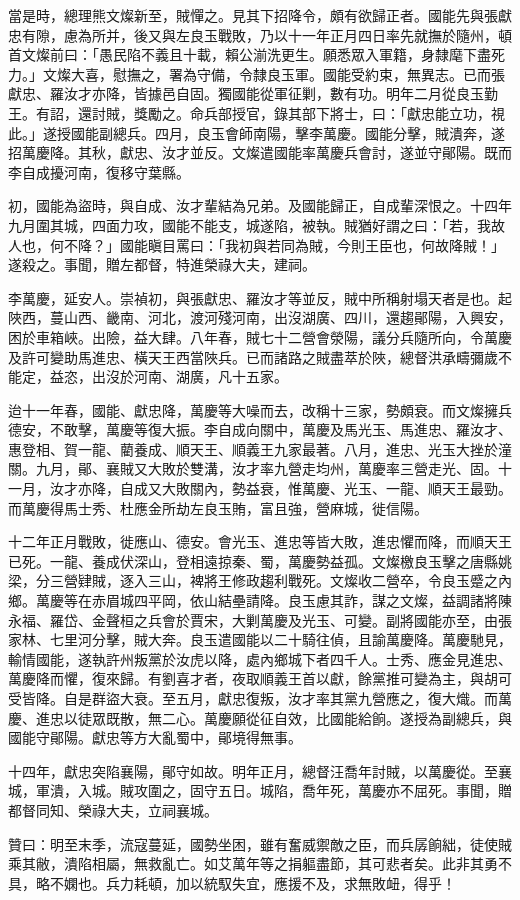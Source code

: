 \begin{pinyinscope}
當是時，總理熊文燦新至，賊憚之。見其下招降令，頗有欲歸正者。國能先與張獻忠有隙，慮為所并，後又與左良玉戰敗，乃以十一年正月四日率先就撫於隨州，頓首文燦前曰：「愚民陷不義且十載，賴公湔洗更生。願悉眾入軍籍，身隸麾下盡死力。」文燦大喜，慰撫之，署為守備，令隸良玉軍。國能受約束，無異志。已而張獻忠、羅汝才亦降，皆據邑自固。獨國能從軍征剿，數有功。明年二月從良玉勤王。有詔，還討賊，獎勵之。命兵部授官，錄其部下將士，曰：「獻忠能立功，視此。」遂授國能副總兵。四月，良玉會師南陽，擊李萬慶。國能分擊，賊潰奔，遂招萬慶降。其秋，獻忠、汝才並反。文燦遣國能率萬慶兵會討，遂並守鄖陽。既而李自成擾河南，復移守葉縣。

初，國能為盜時，與自成、汝才輩結為兄弟。及國能歸正，自成輩深恨之。十四年九月圍其城，四面力攻，國能不能支，城遂陷，被執。賊猶好謂之曰：「若，我故人也，何不降？」國能瞋目罵曰：「我初與若同為賊，今則王臣也，何故降賊！」遂殺之。事聞，贈左都督，特進榮祿大夫，建祠。

李萬慶，延安人。崇禎初，與張獻忠、羅汝才等並反，賊中所稱射塌天者是也。起陜西，蔓山西、畿南、河北，渡河殘河南，出沒湖廣、四川，還趨鄖陽，入興安，困於車箱峽。出險，益大肆。八年春，賊七十二營會滎陽，議分兵隨所向，令萬慶及許可變助馬進忠、橫天王西當陜兵。已而諸路之賊盡萃於陜，總督洪承疇彌歲不能定，益恣，出沒於河南、湖廣，凡十五家。

迨十一年春，國能、獻忠降，萬慶等大噪而去，改稱十三家，勢頗衰。而文燦擁兵德安，不敢擊，萬慶等復大振。李自成向關中，萬慶及馬光玉、馬進忠、羅汝才、惠登相、賀一龍、藺養成、順天王、順義王九家最著。八月，進忠、光玉大挫於潼關。九月，鄖、襄賊又大敗於雙溝，汝才率九營走均州，萬慶率三營走光、固。十一月，汝才亦降，自成又大敗關內，勢益衰，惟萬慶、光玉、一龍、順天王最勁。而萬慶得馬士秀、杜應金所劫左良玉賄，富且強，營麻城，徙信陽。

十二年正月戰敗，徙應山、德安。會光玉、進忠等皆大敗，進忠懼而降，而順天王已死。一龍、養成伏深山，登相遠掠秦、蜀，萬慶勢益孤。文燦檄良玉擊之唐縣姚梁，分三營肄賊，逐入三山，裨將王修政趨利戰死。文燦收二營卒，令良玉蹙之內鄉。萬慶等在赤眉城四平岡，依山結壘請降。良玉慮其詐，謀之文燦，益調諸將陳永福、羅岱、金聲桓之兵會於賈宋，大剿萬慶及光玉、可變。副將國能亦至，由張家林、七里河分擊，賊大奔。良玉遣國能以二十騎往偵，且諭萬慶降。萬慶馳見，輸情國能，遂執許州叛黨於汝虎以降，處內鄉城下者四千人。士秀、應金見進忠、萬慶降而懼，復來歸。有劉喜才者，夜取順義王首以獻，餘黨推可變為主，與胡可受皆降。自是群盜大衰。至五月，獻忠復叛，汝才率其黨九營應之，復大熾。而萬慶、進忠以徒眾既散，無二心。萬慶願從征自效，比國能給餉。遂授為副總兵，與國能守鄖陽。獻忠等方大亂蜀中，鄖境得無事。

十四年，獻忠突陷襄陽，鄖守如故。明年正月，總督汪喬年討賊，以萬慶從。至襄城，軍潰，入城。賊攻圍之，固守五日。城陷，喬年死，萬慶亦不屈死。事聞，贈都督同知、榮祿大夫，立祠襄城。

贊曰：明至末季，流寇蔓延，國勢坐困，雖有奮威禦敵之臣，而兵孱餉絀，徒使賊乘其敝，潰陷相屬，無救亂亡。如艾萬年等之捐軀盡節，其可悲者矣。此非其勇不具，略不嫻也。兵力耗頓，加以統馭失宜，應援不及，求無敗衄，得乎！


\end{pinyinscope}